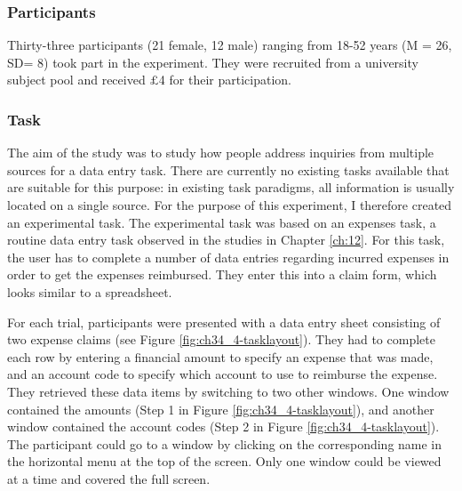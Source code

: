 \subsubsection{Participants}
Thirty-three participants (21 female, 12 male) ranging from 18-52 years (M = 26, SD= 8) took part in the experiment. They were recruited from a university subject pool and received $\pounds$4 for their participation.

\subsubsection{Task}
The aim of the study was to study how people address inquiries from multiple sources for a data entry task. There are currently no existing tasks available that are suitable for this purpose: in existing task paradigms, all information is usually located on a single source. For the purpose of this experiment, I therefore created an experimental task. The experimental task was based on an expenses task, a routine data entry task observed in the studies in Chapter \ref{ch:12}. For this task, the user has to complete a number of data entries regarding incurred expenses in order to get the expenses reimbursed. They enter this into a claim form, which looks similar to a spreadsheet. 

For each trial, participants were presented with a data entry sheet consisting of two expense claims (see Figure \ref{fig:ch34_4-tasklayout}). They had to complete each row by entering a financial amount to specify an expense that was made, and an account code to specify which account to use to reimburse the expense. They retrieved these data items by switching to two other windows. One window contained the amounts (Step 1 in Figure \ref{fig:ch34_4-tasklayout}), and another window contained the account codes (Step 2 in Figure \ref{fig:ch34_4-tasklayout}). The participant could go to a window by clicking on the corresponding name in the horizontal menu at the top of the screen. Only one window could be viewed at a time and covered the full screen. 

